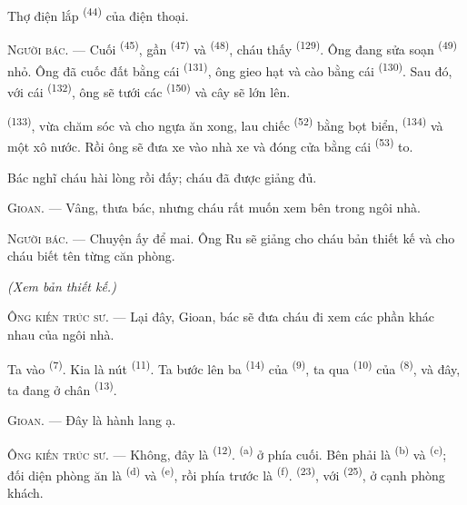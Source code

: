 Thợ điện lắp  \textsuperscript{(44)} của điện thoại.

\VUsaut{3.0mm}

\textsc{Người bác}. --- Cuối  \textsuperscript{(45)}, gần  \textsuperscript{(47)} và  \textsuperscript{(48)}, cháu thấy
 \textsuperscript{(129)}. Ông đang sửa soạn 
\textsuperscript{(49)} nhỏ. Ông đã cuốc đất bằng cái 
\textsuperscript{(131)}, ông gieo hạt và cào bằng cái 
\textsuperscript{(130)}. Sau đó, với cái  \textsuperscript{(132)}, ông
sẽ tưới các  \textsuperscript{(150)} và cây sẽ lớn lên.

 \textsuperscript{(133)}, vừa chăm sóc và cho ngựa ăn xong, lau
chiếc  \textsuperscript{(52)} bằng bọt biển, 
\textsuperscript{(134)} và một xô nước. Rồi ông sẽ đưa xe vào nhà xe và đóng cửa bằng
cái  \textsuperscript{(53)} to.

Bác nghĩ cháu hài lòng rồi đấy; cháu đã được giảng đủ.

\textsc{Gioan}. --- Vâng, thưa bác, nhưng cháu rất muốn xem bên trong ngôi nhà.

\textsc{Người bác}. --- Chuyện ấy để mai. Ông Ru sẽ giảng cho cháu bản thiết kế và cho
cháu biết tên từng căn phòng.

\VUsaut{3.0mm}
\VUsaut{2.4mm}

{\centering\textit{(Xem bản thiết kế.)}\par}
\VUsaut{2.4mm}

\textsc{Ông kiến trúc sư}. --- Lại đây, Gioan, bác sẽ đưa cháu đi xem các phần khác nhau
của ngôi nhà.

Ta vào  \textsuperscript{(7)}. Kia là nút 
\textsuperscript{(11)}. Ta bước lên ba  \textsuperscript{(14)} của
 \textsuperscript{(9)}, ta qua  \textsuperscript{(10)} của
 \textsuperscript{(8)}, và đây, ta đang ở chân 
\textsuperscript{(13)}.

\textsc{Gioan}. --- Đây là hành lang ạ.

\textsc{Ông kiến trúc sư}. --- Không, đây là  \textsuperscript{(12)}.
 \textsuperscript{(a)} ở phía cuối. Bên phải là 
\textsuperscript{(b)} và  \textsuperscript{(c)}; đối diện phòng ăn là
 \textsuperscript{(d)} và  \textsuperscript{(e)},
rồi phía trước là  \textsuperscript{(f)}. 
\textsuperscript{(23)}, với  \textsuperscript{(25)}, ở cạnh phòng khách.

